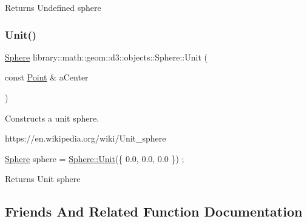 \begin{DoxyReturn}{Returns}
Undefined sphere 
\end{DoxyReturn}
\mbox{\label{classlibrary_1_1math_1_1geom_1_1d3_1_1objects_1_1_sphere_a5464ea9145425db63dedbd896d6c97b0}} 
\subsubsection{\texorpdfstring{Unit()}{Unit()}}
{\footnotesize\ttfamily \hyperlink{classlibrary_1_1math_1_1geom_1_1d3_1_1objects_1_1_sphere}{Sphere} library\+::math\+::geom\+::d3\+::objects\+::\+Sphere\+::\+Unit (\begin{DoxyParamCaption}\item[{const \hyperlink{classlibrary_1_1math_1_1geom_1_1d3_1_1objects_1_1_point}{Point} \&}]{a\+Center }\end{DoxyParamCaption})\hspace{0.3cm}{\ttfamily [static]}}



Constructs a unit sphere. 

https\+://en.wikipedia.\+org/wiki/\+Unit\+\_\+sphere


\begin{DoxyCode}
\hyperlink{classlibrary_1_1math_1_1geom_1_1d3_1_1objects_1_1_sphere_a55dccc8ea16ee55cd7694c26afa8ea39}{Sphere} sphere = \hyperlink{classlibrary_1_1math_1_1geom_1_1d3_1_1objects_1_1_sphere_a5464ea9145425db63dedbd896d6c97b0}{Sphere::Unit}(\{ 0.0, 0.0, 0.0 \}) ;
\end{DoxyCode}


\begin{DoxyReturn}{Returns}
Unit sphere 
\end{DoxyReturn}


\subsection{Friends And Related Function Documentation}
\mbox{\label{classlibrary_1_1math_1_1geom_1_1d3_1_1objects_1_1_sphere_abb141c02e081d1acce5f0d840276a5dd}} 
